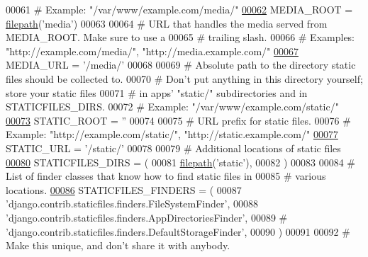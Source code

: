 \begin{DoxyCode}
00061 \textcolor{comment}{# Example: "/var/www/example.com/media/"}
\hypertarget{settings_8py_source_l00062}{}\hyperlink{namespaceELO_1_1settings_a7f83b56101acea110bb525439aaa69aa}{00062} MEDIA\_ROOT = \hyperlink{namespaceELO_1_1settings_a7730264ddd478343e0f282f36d4a5ab4}{filepath}(\textcolor{stringliteral}{'media'})
00063 
00064 \textcolor{comment}{# URL that handles the media served from MEDIA\_ROOT. Make sure to use a}
00065 \textcolor{comment}{# trailing slash.}
00066 \textcolor{comment}{# Examples: "http://example.com/media/", "http://media.example.com/"}
\hypertarget{settings_8py_source_l00067}{}\hyperlink{namespaceELO_1_1settings_acd3e1c3559f7c87f5aad004b76458ddc}{00067} MEDIA\_URL = \textcolor{stringliteral}{'/media/'}
00068 
00069 \textcolor{comment}{# Absolute path to the directory static files should be collected to.}
00070 \textcolor{comment}{# Don't put anything in this directory yourself; store your static files}
00071 \textcolor{comment}{# in apps' "static/" subdirectories and in STATICFILES\_DIRS.}
00072 \textcolor{comment}{# Example: "/var/www/example.com/static/"}
\hypertarget{settings_8py_source_l00073}{}\hyperlink{namespaceELO_1_1settings_ae5539527ada0171fc602c561493398f4}{00073} STATIC\_ROOT = \textcolor{stringliteral}{''}
00074 
00075 \textcolor{comment}{# URL prefix for static files.}
00076 \textcolor{comment}{# Example: "http://example.com/static/", "http://static.example.com/"}
\hypertarget{settings_8py_source_l00077}{}\hyperlink{namespaceELO_1_1settings_a408323f388e22737eedf90471a3809a4}{00077} STATIC\_URL = \textcolor{stringliteral}{'/static/'}
00078 
00079 \textcolor{comment}{# Additional locations of static files}
\hypertarget{settings_8py_source_l00080}{}\hyperlink{namespaceELO_1_1settings_aa2272e7a822b45c2101e4f5a958e22a6}{00080} STATICFILES\_DIRS = (
00081     \hyperlink{namespaceELO_1_1settings_a7730264ddd478343e0f282f36d4a5ab4}{filepath}(\textcolor{stringliteral}{'static'}),
00082 )
00083 
00084 \textcolor{comment}{# List of finder classes that know how to find static files in}
00085 \textcolor{comment}{# various locations.}
\hypertarget{settings_8py_source_l00086}{}\hyperlink{namespaceELO_1_1settings_a3e4decd51fab7bd5bdbdb12aac13b70a}{00086} STATICFILES\_FINDERS = (
00087     \textcolor{stringliteral}{'django.contrib.staticfiles.finders.FileSystemFinder'},
00088     \textcolor{stringliteral}{'django.contrib.staticfiles.finders.AppDirectoriesFinder'},
00089 \textcolor{comment}{#    'django.contrib.staticfiles.finders.DefaultStorageFinder',}
00090 )
00091 
00092 \textcolor{comment}{# Make this unique, and don't share it with anybody.}

\end{DoxyCode}
